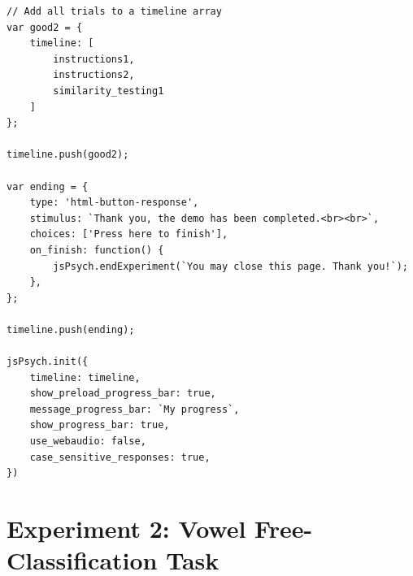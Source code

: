 \documentclass{scrreprt}
\begin{document}
\begin{lstlisting}[style=htmlcssjs]
// Add all trials to a timeline array
var good2 = {
    timeline: [
        instructions1,
        instructions2,
        similarity_testing1
    ]
};

timeline.push(good2);

var ending = {
    type: 'html-button-response',
    stimulus: `Thank you, the demo has been completed.<br><br>`,
    choices: ['Press here to finish'],
    on_finish: function() {
        jsPsych.endExperiment(`You may close this page. Thank you!`);
    },
};

timeline.push(ending);

jsPsych.init({
    timeline: timeline,
    show_preload_progress_bar: true,
    message_progress_bar: `My progress`,
    show_progress_bar: true,
    use_webaudio: false,
    case_sensitive_responses: true,
})
\end{lstlisting}

\clearpage

\section{Experiment 2: Vowel Free-Classification Task}
\end{document}
